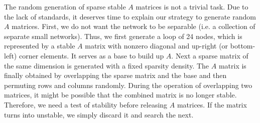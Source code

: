 \documentclass[letterpaper,10pt,journal,final]{IEEEtran}
\theoremstyle{definition}
\theoremstyle{remark}
\begin{document}
The random generation of sparse stable $A$ matrices is not a trivial task. Due
to the lack of standards, it deserves time to explain our strategy to generate
random $A$ matrices. First, we do not want the network to be separable (i.e. a
collection of separate small networks). Thus, we first generate a loop of 24
nodes, which is represented by a stable $A$ matrix with nonzero diagonal and
up-right (or bottom-left) corner elements. It serves as a base to build up
$A$. Next a sparse matrix of the same dimension is generated with a fixed
sparsity density. The $A$ matrix is finally obtained by overlapping the sparse
matrix and the base and then permuting rows and columns randomly. During the
operation of overlapping two matrices, it might be possible that the combined
matrix is no longer stable. Therefore, we need a test of stability before
releasing $A$ matrices. If the matrix turns into unstable, we simply discard it
and search the next.
\end{document}
